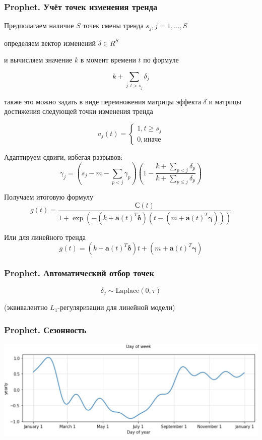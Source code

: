 \documentclass[fullscreen=true, bookmarks=true, hyperref={pdfencoding=unicode}]{beamer}
\begin{document}
\begin{frame}
  \frametitle{Prophet. Учёт точек изменения тренда}

  Предполагаем наличие $S$ точек смены тренда $s_j, j = 1, \dots, S$

  определяем вектор изменений $\delta \in R^S$

  и вычисляем значение $k$ в момент времени $t$ по формуле

  $$ k + \sum\limits_{j:t > s_j} \delta_j $$

  также это можно задать в виде перемножения матрицы эффекта $\delta$ и матрицы достижения следующей точки изменения тренда

  $$ a_j(t) =
    \begin{cases}
    1, t \geq s_j \\
    0, \text{иначе}
    \end{cases}
  $$

  Адаптируем сдвиги, избегая разрывов: $$\gamma_j = \left(s_j - m - \sum\limits_{p < j}\gamma_p \right) \left(1 - \frac{k+\sum\limits_{p < j}\delta_p}{k+\sum\limits_{p \leq j}\delta_p} \right)$$

\end{frame}


\begin{frame}
  Получаем итоговую формулу
  $$ g(t) =
  \frac{С(t)}
  {1 + \exp(
      -(k + \boldsymbol{a}(t)^T\boldsymbol{\delta})
       (t - (m + \boldsymbol{a}(t)^T\boldsymbol{\gamma}))
      )
  }
  $$

  Или для линейного тренда
  $$ g(t) =
      (k + \boldsymbol{a}(t)^T\boldsymbol{\delta})t
      +(m + \boldsymbol{a}(t)^T\boldsymbol{\gamma})
  $$
\end{frame}


\begin{frame}
  \frametitle{Prophet. Автоматический отбор точек}

  $$ \delta_j \sim \text{Laplace}(0, \tau) $$

  (эквивалентно $L_1$-регуляризации для линейной модели)
\end{frame}


\begin{frame}
  \frametitle{Prophet. Сезонность}

  \begin{center}
    \includegraphics[keepaspectratio,
                   width=.8\paperwidth]{seasons.jpg}
  \end{center}

\end{frame}
\end{document}
